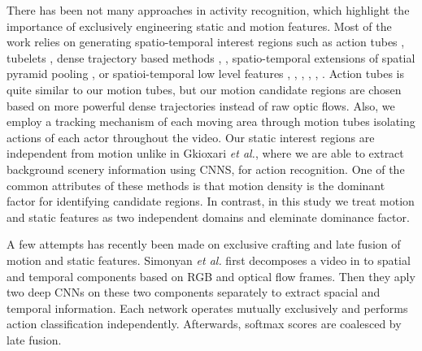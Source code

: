 
There has been not many approaches in activity recognition, which highlight the
importance of exclusively engineering static and motion features. Most of the work
relies on generating spatio-temporal interest regions such as action tubes \cite{gkioxari2015finding},
tubelets \cite{jain2014action}, dense trajectory based methods \cite{van2015apt}, \cite{wang2015action},
spatio-temporal extensions of spatial pyramid pooling \cite{laptev2008learning},
or spatioi-temporal low level features  \cite{schuldt2004recognizing}, \cite{ke2005efficient}, \cite{shechtman2005space},
\cite{wang2011action}, \cite{klaser2008spatio}, \cite{yu2010real}. Action tubes \cite{gkioxari2015finding} is quite similar to 
our motion tubes, but our motion candidate regions are chosen based on more powerful dense trajectories \cite{wang2011action} instead of
raw optic flows. Also, we employ a tracking mechanism of each moving area through motion tubes isolating actions 
of each actor throughout the video. Our static interest regions are independent from motion
unlike in Gkioxari \textit{et al.}\cite{gkioxari2015finding}, where we are able to extract background scenery information using CNNS, for 
action recognition. 
One of the common attributes of these methods is that motion density is the 
dominant factor for identifying candidate regions. 
In contrast, in this study we treat motion and static features 
as two independent domains and eleminate dominance factor. 

A few attempts has recently been made on exclusive crafting and late fusion 
of motion and static features. Simonyan \textit{et al.}\cite{simonyan2014two} first decomposes a video in to 
spatial and temporal components based on RGB and optical flow frames.
Then they aply two deep CNNs on these two components separately to extract spacial and 
temporal information. Each network operates mutually exclusively and performs action classification
independently. Afterwards, softmax scores are coalesced by late fusion. 

